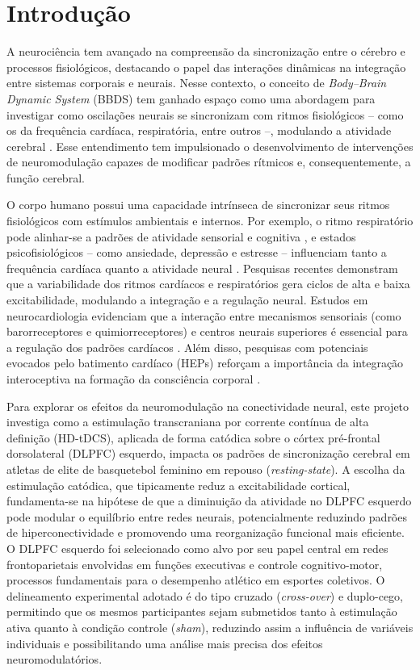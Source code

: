 \chapter{Introdução}
\label{chap:introducao}
A neurociência tem avançado na compreensão da sincronização entre o cérebro e processos fisiológicos, destacando o papel das interações dinâmicas na integração entre sistemas corporais e neurais. Nesse contexto, o conceito de \textit{Body--Brain Dynamic System} (BBDS) tem ganhado espaço como uma abordagem para investigar como oscilações neurais se sincronizam com ritmos fisiológicos – como os da frequência cardíaca, respiratória, entre outros –, modulando a atividade cerebral \cite{cohen2017where,criscuolo2022cognition}. Esse entendimento tem impulsionado o desenvolvimento de intervenções de neuromodulação capazes de modificar padrões rítmicos e, consequentemente, a função cerebral.

O corpo humano possui uma capacidade intrínseca de sincronizar seus ritmos fisiológicos com estímulos ambientais e internos. Por exemplo, o ritmo respiratório pode alinhar-se a padrões de atividade sensorial e cognitiva \cite{haas1985effects}, e estados psicofisiológicos – como ansiedade, depressão e estresse – influenciam tanto a frequência cardíaca quanto a atividade neural \cite{criscuolo2022cognition}. Pesquisas recentes demonstram que a variabilidade dos ritmos cardíacos e respiratórios gera ciclos de alta e baixa excitabilidade, modulando a integração e a regulação neural. Estudos em neurocardiologia evidenciam que a interação entre mecanismos sensoriais (como barorreceptores e quimiorreceptores) e centros neurais superiores é essencial para a regulação dos padrões cardíacos \cite{marcondes2024linguagem}. Além disso, pesquisas com potenciais evocados pelo batimento cardíaco (HEPs) reforçam a importância da integração interoceptiva na formação da consciência corporal \cite{banelli2020skipping, mackinnon2013utilizing, park2018neural}.

Para explorar os efeitos da neuromodulação na conectividade neural, este projeto investiga como a estimulação transcraniana por corrente contínua de alta definição (HD-tDCS), aplicada de forma catódica sobre o córtex pré-frontal dorsolateral (DLPFC) esquerdo, impacta os padrões de sincronização cerebral em atletas de elite de basquetebol feminino em repouso (\textit{resting-state}). A escolha da estimulação catódica, que tipicamente reduz a excitabilidade cortical, fundamenta-se na hipótese de que a diminuição da atividade no DLPFC esquerdo pode modular o equilíbrio entre redes neurais, potencialmente reduzindo padrões de hiperconectividade e promovendo uma reorganização funcional mais eficiente. O DLPFC esquerdo foi selecionado como alvo por seu papel central em redes frontoparietais envolvidas em funções executivas e controle cognitivo-motor, processos fundamentais para o desempenho atlético em esportes coletivos. O delineamento experimental adotado é do tipo cruzado (\textit{cross-over}) e duplo-cego, permitindo que os mesmos participantes sejam submetidos tanto à estimulação ativa quanto à condição controle (\textit{sham}), reduzindo assim a influência de variáveis individuais e possibilitando uma análise mais precisa dos efeitos neuromodulatórios.

